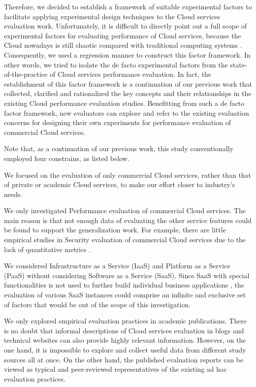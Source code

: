\documentclass[10pt, conference, compsocconf]{IEEEtran}
\begin{document}
Therefore, we decided to establish a framework of suitable experimental factors to facilitate applying experimental design techniques to the Cloud services evaluation work. Unfortunately, it is difficult to directly point out a full scope of experimental factors for evaluating performance of Cloud services, because the Cloud nowadays is still chaotic compared with traditional computing systems \cite{Stokes_2011}. Consequently, we used a regression manner to construct this factor framework. In other words, we tried to isolate the de facto experimental factors from the state-of-the-practice of Cloud services performance evaluation. In fact, the establishment of this factor framework is a continuation of our previous work \cite{Li_OBrien_2012a,Li_OBrien_2012b,Li_OBrien_2012c} that collected, clarified and rationalized the key concepts and their relationships in the existing Cloud performance evaluation studies. Benefitting from such a de facto factor framework, new evaluators can explore and refer to the existing evaluation concerns for designing their own experiments for performance evaluation of commercial Cloud services.

Note that, as a continuation of our previous work, this study conventionally employed four constrains, as listed below.

\begin{itemize*}
    \item	We focused on the evaluation of only commercial Cloud services, rather than that of private or academic Cloud services, to make our effort closer to industry's needs.
    \item	We only investigated Performance evaluation of commercial Cloud services. The main reason is that not enough data of evaluating the other service features could be found to support the generalization work. For example, there are little empirical studies in Security evaluation of commercial Cloud services due to the lack of quantitative metrics \cite{Li_OBrien_2012b}. 
    \item	We considered Infrastructure as a Service (IaaS) and Platform as a Service (PaaS) without considering Software as a Service (SaaS). Since SaaS with special functionalities is not used to further build individual business applications \cite{Binnig_Kossmann_2009}, the evaluation of various SaaS instances could comprise an infinite and exclusive set of factors that would be out of the scope of this investigation.
    \item	We only explored empirical evaluation practices in academic publications. There is no doubt that informal descriptions of Cloud services evaluation in blogs and technical websites can also provide highly relevant information. However, on the one hand, it is impossible to explore and collect useful data from different study sources all at once. On the other hand, the published evaluation reports can be viewed as typical and peer-reviewed representatives of the existing ad hoc evaluation practices.
\end{itemize*}
\end{document}
